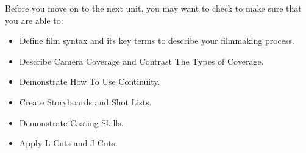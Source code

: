 \documentclass[
]{book}
\providecommand{\tightlist}{%
  \setlength{\itemsep}{0pt}\setlength{\parskip}{0pt}}
\begin{document}
\begin{progress}
Before you move on to the next unit, you may want to check to make sure that you are able to:

\begin{itemize}
\tightlist
\item
  Define film syntax and its key terms to describe your filmmaking process.\\
\item
  Describe Camera Coverage and Contrast The Types of Coverage.\\
\item
  Demonstrate How To Use Continuity.\\
\item
  Create Storyboards and Shot Lists.\\
\item
  Demonstrate Casting Skills.\\
\item
  Apply L Cuts and J Cuts.
\end{itemize}
\end{progress}

  
\end{document}
